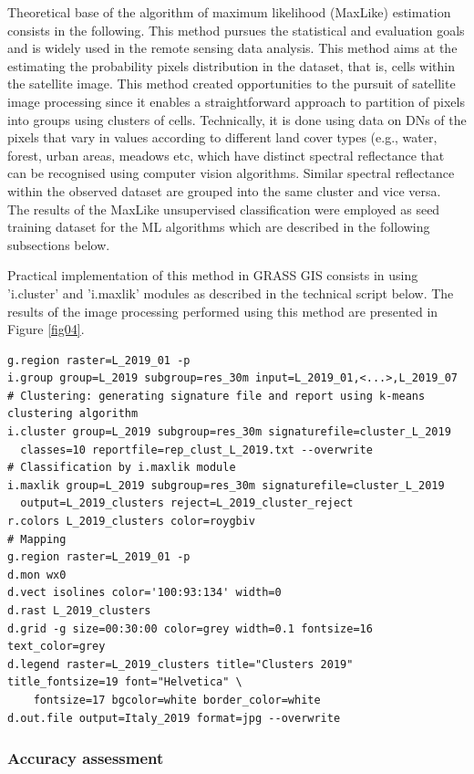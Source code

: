 \documentclass{elektr}
\begin{document}
Theoretical base of the algorithm of maximum likelihood (MaxLike) estimation consists in the following. This method pursues the statistical and evaluation goals and is widely used in the remote sensing data analysis. This method aims at the estimating the probability pixels distribution in the dataset, that is, cells within the satellite image. This method  created opportunities to the pursuit of satellite image processing since it enables a straightforward approach to partition of pixels into groups using clusters of cells. Technically, it is done using data on DNs of the pixels that vary in values according to different land cover types (e.g., water, forest, urban areas, meadows etc, which have distinct spectral reflectance that can be recognised using computer vision algorithms. Similar spectral reflectance within the observed dataset are grouped into the same cluster and vice versa. The results of the MaxLike unsupervised classification were employed as seed training dataset for the ML algorithms which are described in the following subsections below.

Practical implementation of this method in GRASS GIS consists in using 'i.cluster' and 'i.maxlik' modules as described in the technical script below. The results of the image processing performed using this method are presented in Figure \ref{fig04}. 

\begin{footnotesize}
\begin{verbatim}
g.region raster=L_2019_01 -p
i.group group=L_2019 subgroup=res_30m input=L_2019_01,<...>,L_2019_07
# Clustering: generating signature file and report using k-means clustering algorithm
i.cluster group=L_2019 subgroup=res_30m signaturefile=cluster_L_2019 
  classes=10 reportfile=rep_clust_L_2019.txt --overwrite
# Classification by i.maxlik module
i.maxlik group=L_2019 subgroup=res_30m signaturefile=cluster_L_2019
  output=L_2019_clusters reject=L_2019_cluster_reject
r.colors L_2019_clusters color=roygbiv
# Mapping
g.region raster=L_2019_01 -p
d.mon wx0
d.vect isolines color='100:93:134' width=0
d.rast L_2019_clusters
d.grid -g size=00:30:00 color=grey width=0.1 fontsize=16 text_color=grey
d.legend raster=L_2019_clusters title="Clusters 2019" title_fontsize=19 font="Helvetica" \
	fontsize=17 bgcolor=white border_color=white
d.out.file output=Italy_2019 format=jpg --overwrite
\end{verbatim}
\end{footnotesize}

\subsubsection{Accuracy assessment}
\end{document}
